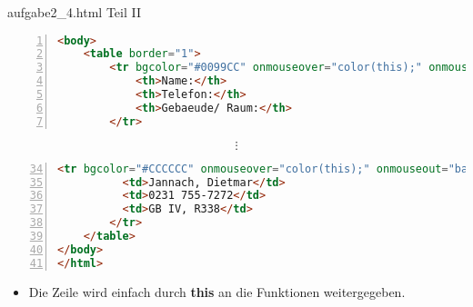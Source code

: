 \begin{frame}[fragile]{aufgabe2\_4.html Teil II}
\tiny{\begin{lstlisting}[language = HTML,
                   breaklines=true, 
		   firstnumber=last,
                   numbers = left, 
                   numbersep = 3pt]
<body>
	<table border="1">
    	<tr bgcolor="#0099CC" onmouseover="color(this);" onmouseout="backcolor(this)">
        	<th>Name:</th>
        	<th>Telefon:</th>
        	<th>Gebaeude/ Raum:</th>
        </tr>
\end{lstlisting}
\[\vdots\]
\begin{lstlisting}[language = HTML,
                   breaklines=true, 
		   firstnumber=34,
                   numbers = left, 
                   numbersep = 3pt]
        <tr bgcolor="#CCCCCC" onmouseover="color(this);" onmouseout="backcolor(this)">
          <td>Jannach, Dietmar</td>
          <td>0231 755-7272</td>
          <td>GB IV, R338</td>
        </tr>
    </table>
</body>
</html>
\end{lstlisting}}
\normalsize
\pause
\begin{itemize}
\item Die Zeile wird einfach durch \textbf{this} an die Funktionen weitergegeben.
\end{itemize}
\end{frame}

